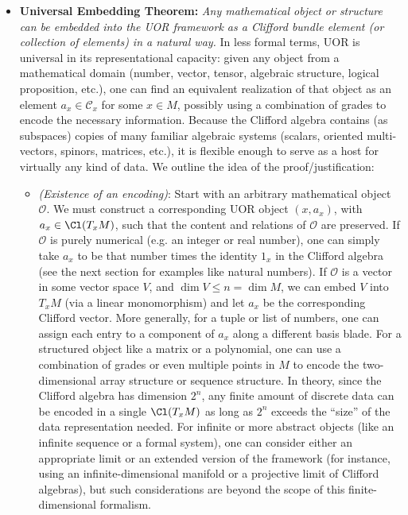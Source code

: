 \documentclass[12pt]{article}
\begin{document}
\begin{itemize}
    \item \textbf{Universal Embedding Theorem:} \emph{Any mathematical object or structure can be embedded into the UOR framework as a Clifford bundle element (or collection of elements) in a natural way.}  In less formal terms, UOR is universal in its representational capacity: given any object from a mathematical domain (number, vector, tensor, algebraic structure, logical proposition, etc.), one can find an equivalent realization of that object as an element $a_x \in \mathcal{C}_x$ for some $x \in M$, possibly using a combination of grades to encode the necessary information. Because the Clifford algebra contains (as subspaces) copies of many familiar algebraic systems (scalars, oriented multi-vectors, spinors, matrices, etc.), it is flexible enough to serve as a host for virtually any kind of data. We outline the idea of the proof/justification:
    \begin{itemize}
       \item \textit{(Existence of an encoding)}: Start with an arbitrary mathematical object $\mathcal{O}$. We must construct a corresponding UOR object $(x, a_x)$, with $a_x \in \Cl(T_xM)$, such that the content and relations of $\mathcal{O}$ are preserved. If $\mathcal{O}$ is purely numerical (e.g. an integer or real number), one can simply take $a_x$ to be that number times the identity $1_x$ in the Clifford algebra (see the next section for examples like natural numbers). If $\mathcal{O}$ is a vector in some vector space $V$, and $\dim V \le n = \dim M$, we can embed $V$ into $T_xM$ (via a linear monomorphism) and let $a_x$ be the corresponding Clifford vector. More generally, for a tuple or list of numbers, one can assign each entry to a component of $a_x$ along a different basis blade. For a structured object like a matrix or a polynomial, one can use a combination of grades or even multiple points in $M$ to encode the two-dimensional array structure or sequence structure. In theory, since the Clifford algebra has dimension $2^n$, any finite amount of discrete data can be encoded in a single $\Cl(T_xM)$ as long as $2^n$ exceeds the “size” of the data representation needed. For infinite or more abstract objects (like an infinite sequence or a formal system), one can consider either an appropriate limit or an extended version of the framework (for instance, using an infinite-dimensional manifold or a projective limit of Clifford algebras), but such considerations are beyond the scope of this finite-dimensional formalism.

\end{itemize}
\end{itemize}
\end{document}
